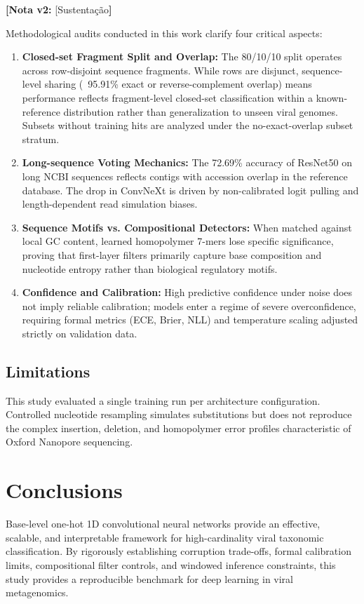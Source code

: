 \documentclass[11pt,a4paper]{article}
\newcommand{\notavdois}[1]{\par\vspace{0.4em}\noindent\colorbox{yellow!25}{\begin{minipage}{0.96\linewidth}\footnotesize\textbf{[Nota v2:} #1\textbf{]}\end{minipage}}\par\vspace{0.4em}}
\begin{document}
{{{\notavdois{[Sustentação}


Methodological audits conducted in this work clarify four critical aspects:
\begin{enumerate}
\item \textbf{Closed-set Fragment Split and Overlap:} The 80/10/10 split operates across row-disjoint sequence fragments. While rows are disjunct, sequence-level sharing (~95.91\% exact or reverse-complement overlap) means performance reflects fragment-level closed-set classification within a known-reference distribution rather than generalization to unseen viral genomes. Subsets without training hits are analyzed under the no-exact-overlap subset stratum.
\item \textbf{Long-sequence Voting Mechanics:} The 72.69\% accuracy of ResNet50 on long NCBI sequences reflects contigs with accession overlap in the reference database. The drop in ConvNeXt is driven by non-calibrated logit pulling and length-dependent read simulation biases.
\item \textbf{Sequence Motifs vs. Compositional Detectors:} When matched against local GC content, learned homopolymer 7-mers lose specific significance, proving that first-layer filters primarily capture base composition and nucleotide entropy rather than biological regulatory motifs.
\item \textbf{Confidence and Calibration:} High predictive confidence under noise does not imply reliable calibration; models enter a regime of severe overconfidence, requiring formal metrics (ECE, Brier, NLL) and temperature scaling adjusted strictly on validation data.
\end{enumerate}

\subsection{Limitations}
This study evaluated a single training run per architecture configuration. Controlled nucleotide resampling simulates substitutions but does not reproduce the complex insertion, deletion, and homopolymer error profiles characteristic of Oxford Nanopore sequencing.

\section{Conclusions}
Base-level one-hot 1D convolutional neural networks provide an effective, scalable, and interpretable framework for high-cardinality viral taxonomic classification. By rigorously establishing corruption trade-offs, formal calibration limits, compositional filter controls, and windowed inference constraints, this study provides a reproducible benchmark for deep learning in viral metagenomics.

}}}
\end{document}
